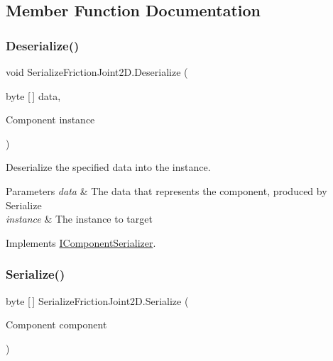 \subsection{Member Function Documentation}
\mbox{\label{class_serialize_friction_joint2_d_a54d659c051702c28e03ab1d9cb938605}} 
\subsubsection{\texorpdfstring{Deserialize()}{Deserialize()}}
{\footnotesize\ttfamily void Serialize\+Friction\+Joint2\+D.\+Deserialize (\begin{DoxyParamCaption}\item[{byte \mbox{[}$\,$\mbox{]}}]{data,  }\item[{Component}]{instance }\end{DoxyParamCaption})\hspace{0.3cm}{\ttfamily [inline]}}



Deserialize the specified data into the instance. 


\begin{DoxyParams}{Parameters}
{\em data} & The data that represents the component, produced by Serialize \\
\hline
{\em instance} & The instance to target \\
\hline
\end{DoxyParams}


Implements \hyperlink{interface_i_component_serializer_a4cc366a5c78b33d47a90c209d8fed883}{I\+Component\+Serializer}.

\mbox{\label{class_serialize_friction_joint2_d_a6063f9c73da7ddac92e9da48628f17c1}} 
\subsubsection{\texorpdfstring{Serialize()}{Serialize()}}
{\footnotesize\ttfamily byte \mbox{[}$\,$\mbox{]} Serialize\+Friction\+Joint2\+D.\+Serialize (\begin{DoxyParamCaption}\item[{Component}]{component }\end{DoxyParamCaption})\hspace{0.3cm}{\ttfamily [inline]}}



